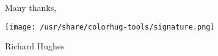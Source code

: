 \documentclass[a4paper,10pt,oneside]{letter}
\begin{document}
\vspace{10px}
\hspace{50px}Many thanks,

\hspace{75px}\texttt{[image: /usr/share/colorhug-tools/signature.png]}

\hspace{100px}Richard Hughes

\vspace{20px}
\end{document}
